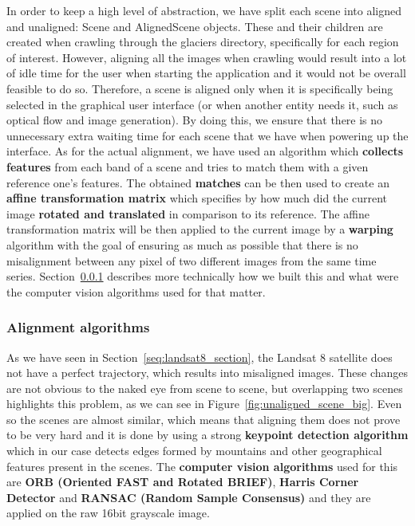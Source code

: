 \documentclass[11pt, a4paper]{report}
\begin{document}
	In order to keep a high level of abstraction, we have split each scene into aligned and unaligned: Scene and AlignedScene objects. These and their children are created when crawling through the glaciers directory, specifically for each region of interest. However, aligning all the images when crawling would result into a lot of idle time for the user when starting the application and it would not be overall feasible to do so. Therefore, a scene is aligned only when it is specifically being selected in the graphical user interface (or when another entity needs it, such as optical flow and image generation). By doing this, we ensure that there is no unnecessary extra waiting time for each scene that we have when powering up the interface.
	As for the actual alignment, we have used an algorithm which \textbf{collects features} from each band of a scene and tries to match them with a given reference one's features. The obtained \textbf{matches} can be then used to create an \textbf{affine transformation matrix} which specifies by how much did the current image \textbf{rotated and translated} in comparison to its reference. The affine transformation matrix will be then applied to the current image by a \textbf{warping} algorithm with the goal of ensuring as much as possible that there is no misalignment between any pixel of two different images from the same time series. Section~\ref{seq:alignment_algorithm} describes more technically how we built this and what were the computer vision algorithms used for that matter.
	
	\subsubsection{Alignment algorithms}
	\label{seq:alignment_algorithm}
	
	As we have seen in Section~\ref{seq:landsat8_section}, the Landsat 8 satellite does not have a perfect trajectory, which results into misaligned images. These changes are not obvious to the naked eye from scene to scene, but overlapping two scenes highlights this problem, as we can see in Figure~\ref{fig:unaligned_scene_big}. Even so the scenes are almost similar, which means that aligning them does not prove to be very hard and it is done by using a strong \textbf{keypoint detection algorithm} which in our case detects edges formed by mountains and other geographical features present in the scenes. The \textbf{computer vision algorithms} used for this are \textbf{ORB (Oriented FAST and Rotated BRIEF)}, \textbf{Harris Corner Detector} and \textbf{RANSAC (Random Sample Consensus)} and they are applied on the raw 16bit grayscale image.
	
\end{document}
